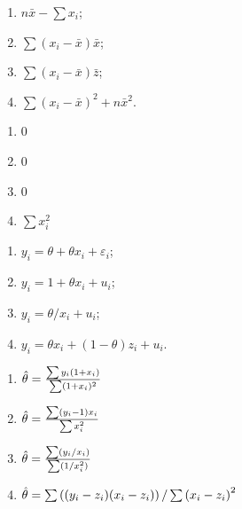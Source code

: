 \begin{problem}
\begin{enumerate}
\item $n\bar x - \sum x_i$;
\item $\sum (x_i - \bar x)\bar x$;
\item $\sum (x_i - \bar x)\bar z$;
\item $\sum (x_i - \bar x)^2 + n \bar{x}^2$.
\end{enumerate}

\begin{sol}
\begin{enumerate}
\item $0$
\item $0$
\item $0$
\item $\sum x_i^2$
\end{enumerate}
\end{sol}
\end{problem}


\begin{problem}

\begin{enumerate}
\item $y_i = \theta + \theta x_i + \varepsilon_i$;
\item $y_i = 1 + \theta x_i + u_i$;
\item $y_i = \theta / x_i + u_i$;
\item $y_i = \theta x_i + (1-\theta)z_i+u_i$.
\end{enumerate}

\begin{sol}
\begin{enumerate}
\item $\hat{\theta} = \frac{\sum y_i (1 + x_i)}{\sum (1 + x_i)^2}$
\item $\hat{\theta} = \frac{\sum (y_i - 1) x_i}{\sum x_i^2}$
\item $\hat{\theta} = \frac{\sum (y_i / x_i)}{\sum (1 / x_i^2)}$
\item $\hat{\theta} = \sum \left((y_i - z_i)(x_i - z_i) \right) / \sum \left(x_i - z_i\right)^2$
\end{enumerate}
\end{sol}
\end{problem}


